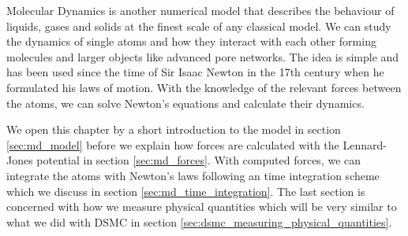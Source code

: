 Molecular Dynamics is another numerical model that describes the behaviour of liquids, gases and solids at the finest scale of any classical model. We can study the dynamics of single atoms and how they interact with each other forming molecules and larger objects like advanced pore networks. The idea is simple and has been used since the time of Sir Isaac Newton in the 17th century when he formulated his laws of motion. With the knowledge of the relevant forces between the atoms, we can solve Newton's equations and calculate their dynamics.

We open this chapter by a short introduction to the model in section \ref{sec:md_model} before we explain how forces are calculated with the Lennard-Jones potential in section \ref{sec:md_forces}. With computed forces, we can integrate the atoms with Newton's laws following an time integration scheme which we discuss in section \ref{sec:md_time_integration}. The last section is concerned with how we measure physical quantities which will be very similar to what we did with DSMC in section \ref{sec:dsmc_measuring_physical_quantities}.